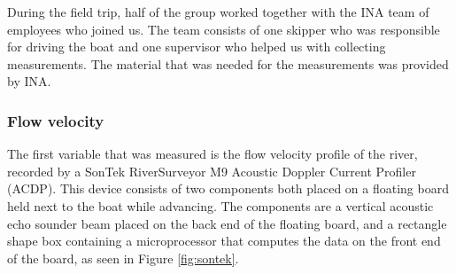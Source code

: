 
During the field trip, half of the group worked together with the INA team of employees who joined us. The team consists of one skipper who was responsible for driving the boat and one supervisor who helped us with collecting measurements. The material that was needed for the measurements was provided by INA. 


\subsubsection{Flow velocity}
The first variable that was measured is the flow velocity profile of the river, recorded by a SonTek RiverSurveyor M9 Acoustic Doppler Current Profiler (ACDP). This device consists of two components both placed on a floating board held next to the boat while advancing. The components are a vertical acoustic echo sounder beam placed on the back end of the floating board, and a rectangle shape box containing a microprocessor that computes the data on the front end of the board, as seen in Figure \ref{fig:sontek}.

